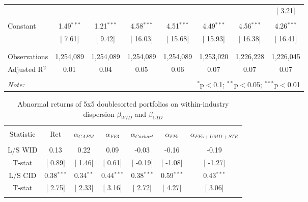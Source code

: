 \documentclass[16pt]{article}
\begin{document}
\begin{table}[!htbp]
\begin{tabular}{@{\extracolsep{0pt}}lccccccc}
  &  &  &  &  &  &  & [ 3.21] \\ 
  & & & & & & & \\ 
 Constant & 1.49$^{***}$ & 1.21$^{***}$ & 4.58$^{***}$ & 4.51$^{***}$ & 4.49$^{***}$ & 4.56$^{***}$ & 4.26$^{***}$ \\ 
  & [ 7.61] & [ 9.42] & [ 16.03] & [ 15.68] & [ 15.93] & [ 16.38] & [ 16.41] \\ 
  & & & & & & & \\ 
\hline \\[-1.8ex] 
Observations & 1,254,089 & 1,254,089 & 1,254,089 & 1,254,089 & 1,253,020 & 1,226,228 & 1,226,045 \\ 
Adjusted R$^{2}$ & 0.01 & 0.04 & 0.05 & 0.06 & 0.07 & 0.07 & 0.07 \\ 
\hline 
\hline \\[-1.8ex] 
\textit{Note:}  & \multicolumn{7}{r}{$^{*}$p$<$0.1; $^{**}$p$<$0.05; $^{***}$p$<$0.01} \\ 
\end{tabular} 
\end{table}


\clearpage


\begin{table}[!htbp] \centering 
  \caption{Abnormal returns of 5x5 doublesorted portfolios on within-industry dispersion $\beta_{WID}$ and $\beta_{CID}$} 
  \label{} 
\begin{tabular}{@{\extracolsep{5pt}} ccccccc} 
\\[-1.8ex]\hline 
\hline \\[-1.8ex] 
Statistic & Ret & $\alpha_{CAPM}$ & $\alpha_{FF3}$ & $\alpha_{Carhart}$ & $\alpha_{FF5}$ & $\alpha_{FF5+UMD+STR}$ \\ 
\hline \\[-1.8ex] 
L/S WID & 0.13 & 0.22 & 0.09 & -0.03 & -0.16 & -0.19 \\ 
T-stat & [ 0.89] & [ 1.46] & [ 0.61] & [ -0.19] & [ -1.08] & [ -1.27] \\ 
L/S CID & 0.38$^{***}$ & 0.34$^{**}$ & 0.44$^{***}$ & 0.38$^{***}$ & 0.59$^{***}$ & 0.43$^{***}$ \\ 
T-stat & [ 2.75] & [ 2.33] & [ 3.16] & [ 2.72] & [ 4.27] & [ 3.06] \\ 
\hline \\[-1.8ex] 
\end{tabular} 
\end{table}
\end{document}
